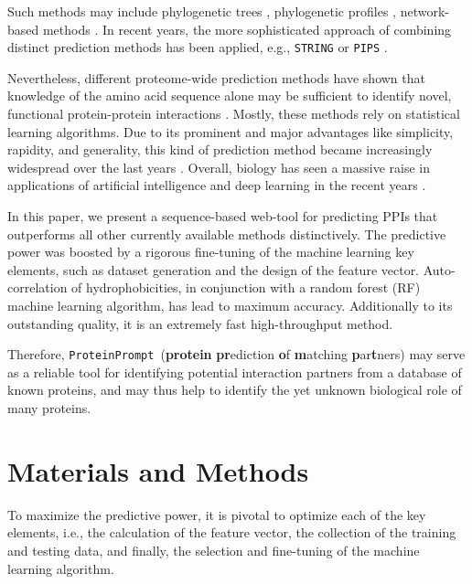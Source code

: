 \documentclass[3p,times,twocolumn]{elsarticle}
\newcommand{\tool}{\texttt{ProteinPrompt}}
\begin{document}
Such methods may include phylogenetic trees \cite{Pazos:2001},
phylogenetic profiles \cite{Barker:2005}, network-based methods
\cite{Yook:2004, Clauset:2008}. In recent years, the more
sophisticated approach of combining distinct prediction methods has
been applied, e.g., \texttt{STRING} \cite{Szklarczyk:2011} or
\texttt{PIPS} \cite{McDowall:2009}.

Nevertheless, different proteome-wide prediction methods have shown
that knowledge of the amino acid sequence alone may be sufficient to
identify novel, functional protein-protein interactions
\cite{Martin:2005, Shen:2007}.
Mostly, these methods rely on statistical learning algorithms.
Due to its prominent and major advantages like simplicity, rapidity, and generality, this kind of
prediction method became increasingly widespread over the last years
\cite{Ofran:2003, Betel:2007, Liu:2012, Perovic:2017, Pan:2010}.
Overall, biology has seen a massive raise in applications
of artificial intelligence and deep learning in the recent years
\cite{Ching:2018}.

In this paper, we present a sequence-based web-tool for predicting
PPIs that outperforms all other currently available methods distinctively.
The predictive power was boosted by a rigorous fine-tuning
of the machine learning key elements, such as
dataset generation and the design of the feature vector.
Auto-correlation of hydrophobicities,
in conjunction with a random forest (RF) machine learning algorithm,
has lead to maximum accuracy.
Additionally to its outstanding quality, it is 
an extremely fast high-throughput
method.

Therefore, \tool\  (\textbf{protein} \textbf{pr}ediction \textbf{o}f \textbf{m}atching \textbf{p}ar\textbf{t}ners)
may serve as a reliable tool for identifying potential interaction partners from a database of
known proteins, and may thus help to identify the yet unknown
biological role of many proteins.



\section{Materials and Methods}

To maximize the predictive power, it is pivotal to optimize each of
the key elements, i.e., the calculation of the feature vector, the
collection of the training and testing data, and finally, the
selection and fine-tuning of the machine learning algorithm. 
\end{document}
